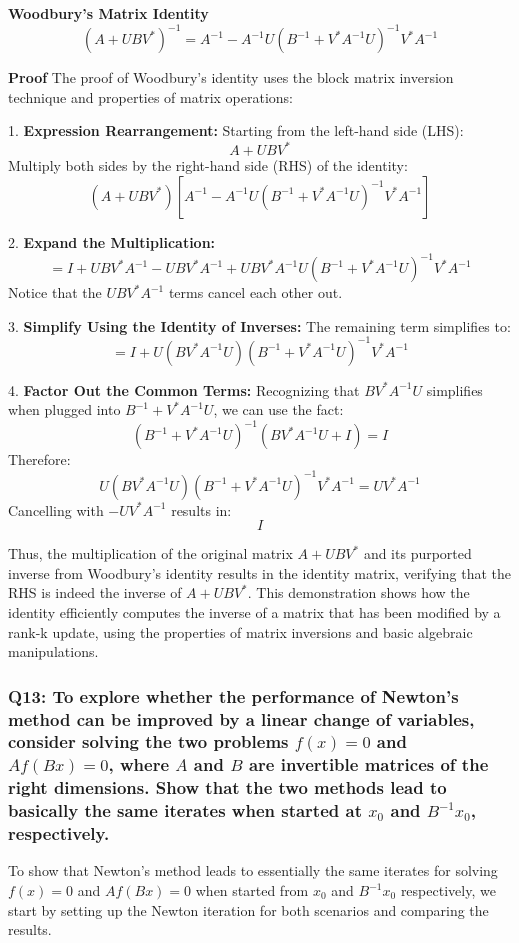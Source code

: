 \documentclass[8pt]{article}
\begin{document}
\textbf{ Woodbury's Matrix Identity}
\[ (A + UBV^*)^{-1} = A^{-1} - A^{-1}U(B^{-1} + V^* A^{-1} U)^{-1} V^* A^{-1} \]

\textbf{Proof}
The proof of Woodbury’s identity uses the block matrix inversion technique and properties of matrix operations:

1. \textbf{Expression Rearrangement:}
   Starting from the left-hand side (LHS):
   \[ A + UBV^* \]
   Multiply both sides by the right-hand side (RHS) of the identity:
   \[ (A + UBV^*)[A^{-1} - A^{-1}U(B^{-1} + V^* A^{-1} U)^{-1} V^* A^{-1}] \]

2.\textbf{ Expand the Multiplication:}
   \[ = I + UBV^*A^{-1} - UBV^*A^{-1} + UBV^*A^{-1}U(B^{-1} + V^* A^{-1} U)^{-1} V^* A^{-1} \]
   Notice that the \(UBV^*A^{-1}\) terms cancel each other out.

3.\textbf{ Simplify Using the Identity of Inverses:}
   The remaining term simplifies to:
   \[ = I + U(BV^*A^{-1}U)(B^{-1} + V^* A^{-1} U)^{-1} V^* A^{-1} \]

4. \textbf{Factor Out the Common Terms:}
   Recognizing that \(BV^*A^{-1}U\) simplifies when plugged into \(B^{-1} + V^* A^{-1} U\), we can use the fact:
   \[ (B^{-1} + V^* A^{-1} U)^{-1} (BV^*A^{-1}U + I) = I \]
   Therefore:
   \[ U(BV^*A^{-1}U)(B^{-1} + V^* A^{-1} U)^{-1} V^* A^{-1} = UV^* A^{-1} \]
   Cancelling with \( - UV^* A^{-1} \) results in:
   \[ I \]

Thus, the multiplication of the original matrix \(A + UBV^*\) and its purported inverse from Woodbury’s identity results in the identity matrix, verifying that the RHS is indeed the inverse of \(A + UBV^*\). This demonstration shows how the identity efficiently computes the inverse of a matrix that has been modified by a rank-k update, using the properties of matrix inversions and basic algebraic manipulations.

\subsubsection*{Q13: To explore whether the performance of Newton’s method can be improved by a linear change of variables, consider solving the two problems \(f(x) = 0\) and \(Af(Bx) = 0\), where \(A\) and \(B\) are invertible matrices of the right dimensions. Show that the two methods lead to basically the same iterates when started at \(x_0\) and \(B^{-1} x_0\), respectively.}

To show that Newton's method leads to essentially the same iterates for solving \( f(x) = 0 \) and \( Af(Bx) = 0 \) when started from \( x_0 \) and \( B^{-1} x_0 \) respectively, we start by setting up the Newton iteration for both scenarios and comparing the results.
\end{document}
